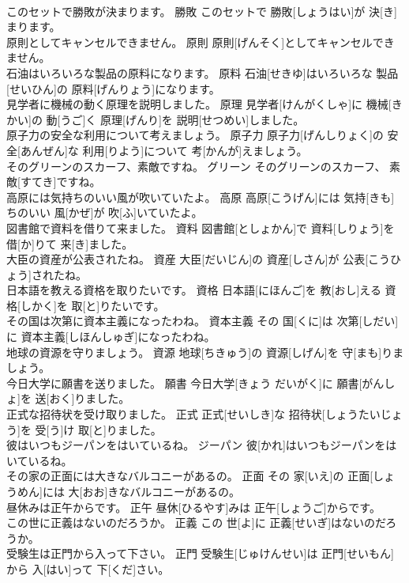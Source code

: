 \documentclass[8pt]{extreport}
\begin{document}
\begin{CJK}{UTF8}{min}
\\	このセットで勝敗が決まります。	勝敗	このセットで 勝敗[しょうはい]が 決[き]まります。	
\\	原則としてキャンセルできません。	原則	原則[げんそく]としてキャンセルできません。	
\\	石油はいろいろな製品の原料になります。	原料	石油[せきゆ]はいろいろな 製品[せいひん]の 原料[げんりょう]になります。	
\\	見学者に機械の動く原理を説明しました。	原理	見学者[けんがくしゃ]に 機械[きかい]の 動[うご]く 原理[げんり]を 説明[せつめい]しました。	
\\	原子力の安全な利用について考えましょう。	原子力	原子力[げんしりょく]の 安全[あんぜん]な 利用[りよう]について 考[かんが]えましょう。	
\\	そのグリーンのスカーフ、素敵ですね。	グリーン	そのグリーンのスカーフ、 素敵[すてき]ですね。	
\\	高原には気持ちのいい風が吹いていたよ。	高原	高原[こうげん]には 気持[きも]ちのいい 風[かぜ]が 吹[ふ]いていたよ。	
\\	図書館で資料を借りて来ました。	資料	図書館[としょかん]で 資料[しりょう]を 借[か]りて 来[き]ました。	
\\	大臣の資産が公表されたね。	資産	大臣[だいじん]の 資産[しさん]が 公表[こうひょう]されたね。	
\\	日本語を教える資格を取りたいです。	資格	日本語[にほんご]を 教[おし]える 資格[しかく]を 取[と]りたいです。	
\\	その国は次第に資本主義になったわね。	資本主義	その 国[くに]は 次第[しだい]に 資本主義[しほんしゅぎ]になったわね。	
\\	地球の資源を守りましょう。	資源	地球[ちきゅう]の 資源[しげん]を 守[まも]りましょう。	
\\	今日大学に願書を送りました。	願書	今日大学[きょう だいがく]に 願書[がんしょ]を 送[おく]りました。	
\\	正式な招待状を受け取りました。	正式	正式[せいしき]な 招待状[しょうたいじょう]を 受[う]け 取[と]りました。	
\\	彼はいつもジーパンをはいているね。	ジーパン	彼[かれ]はいつもジーパンをはいているね。	
\\	その家の正面には大きなバルコニーがあるの。	正面	その 家[いえ]の 正面[しょうめん]には 大[おお]きなバルコニーがあるの。	
\\	昼休みは正午からです。	正午	昼休[ひるやす]みは 正午[しょうご]からです。	
\\	この世に正義はないのだろうか。	正義	この 世[よ]に 正義[せいぎ]はないのだろうか。	
\\	受験生は正門から入って下さい。	正門	受験生[じゅけんせい]は 正門[せいもん]から 入[はい]って 下[くだ]さい。	

\end{CJK}
\end{document}
